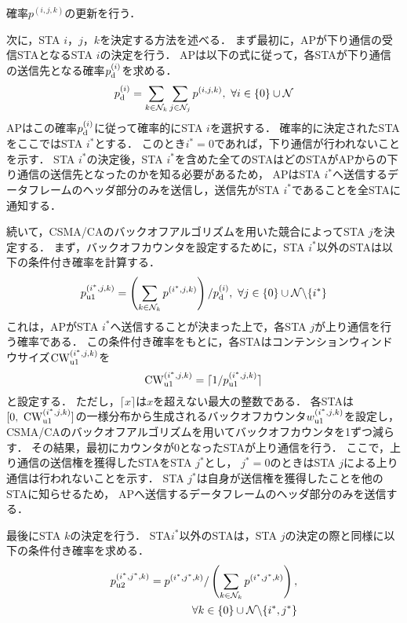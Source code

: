 \documentclass[technicalreport]{ieicej}
\newcommand{\pijk}{p^{(i,j,k)}}
\newcommand{\mthnj}{{\mathcal N}_j}
\newcommand{\mthnk}{{\mathcal N}_k}
\begin{document}
		確率$\pijk$の更新を行う．
		\par
		次に，STA $i$，$j$，$k$を決定する方法を述べる．
		まず最初に，APが下り通信の受信STAとなるSTA $i$の決定を行う．
		APは以下の式に従って，各STAが下り通信の送信先となる確率$p_{\rm d}^{(i)}$を求める．
		\begin{equation}
			p_{\rm d}^{(i)}= \sum_{k\in\mthnk}\sum_{j\in\mthnj}p^{(i,j,k)}, \ \forall i \in \{0\}\cup{\mathcal N}
		\end{equation}
		APはこの確率$p_{\rm d}^{(i)}$に従って確率的にSTA $i$を選択する．
		確率的に決定されたSTAをここではSTA $i^*$とする．
		このとき$i^*=0$であれば，下り通信が行われないことを示す．
		STA $i^*$の決定後，STA $i^*$を含めた全てのSTAはどのSTAがAPからの下り通信の送信先となったのかを知る必要があるため，
		APはSTA $i^*$へ送信するデータフレームのヘッダ部分のみを送信し，送信先がSTA $i^*$であることを全STAに通知する．
		\par
		続いて，CSMA/CAのバックオフアルゴリズムを用いた競合によってSTA $j$を決定する．
		まず，バックオフカウンタを設定するために，STA $i^*$以外のSTAは以下の条件付き確率を計算する．
		\begin{align}
			p_{\rm u1}^{(i^*,j,k)}=\left(\sum_{k\in\mthnk} p^{(i^*,j,k)}\right) / p_{\rm d}^{(i)},\ \forall j \in \{0\}\cup{\mathcal N}\backslash \{i^*\}
		\end{align}
		これは，APがSTA $i^*$へ送信することが決まった上で，各STA $j$が上り通信を行う確率である．
		この条件付き確率をもとに，各STAはコンテンションウィンドウサイズ${\rm CW}^{(i^*,j,k)}_{\rm u1}$を
		\begin{equation}
			{\rm CW}^{(i^*,j,k)}_{\rm u1} = \lceil 1/p_{\rm u1}^{(i^*,j,k)} \rceil
		\end{equation}
		と設定する．
		ただし，$\lceil x \rceil$は$x$を超えない最大の整数である．
		各STAは$[0,\ {\rm CW}^{(i^*,j,k)}_{\rm u1}]$の一様分布から生成されるバックオフカウンタ$w_{\rm u1}^{(i^*,j,k)}$を設定し，
		CSMA/CAのバックオフアルゴリズムを用いてバックオフカウンタを1ずつ減らす．
		その結果，最初にカウンタが0となったSTAが上り通信を行う．
		ここで，上り通信の送信権を獲得したSTAをSTA $j^*$とし，
		$j^*=0$のときはSTA $j$による上り通信は行われないことを示す．
		STA $j^*$は自身が送信権を獲得したことを他のSTAに知らせるため，
		APへ送信するデータフレームのヘッダ部分のみを送信する．
		\par
		最後にSTA $k$の決定を行う．
		STA$i^*$以外のSTAは，STA $j$の決定の際と同様に以下の条件付き確率を求める．
		\begin{align}
			p_{\rm u2}^{(i^*,j^*,k)}=p^{(i^*,j^*,k)} / \left(\sum_{k\in\mthnk} p^{(i^*,j^*,k)}\right), \nonumber\\
			\qquad\qquad\forall k \in \{0\}\cup{\mathcal N}\backslash \{i^*,j^*\}
		\end{align}
\end{document}

